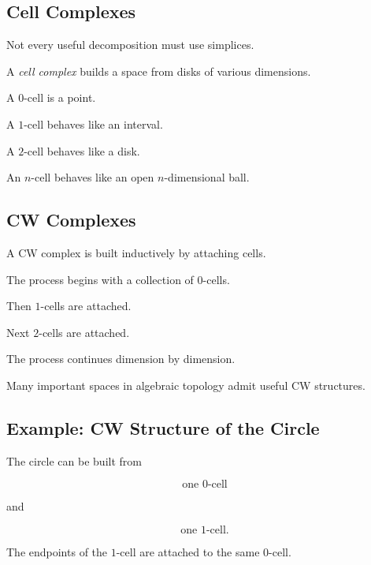 \subsection{Cell Complexes}
\label{subsec:cell-complexes}

Not every useful decomposition must use simplices.

A \emph{cell complex} builds a space from disks of various dimensions.

A \(0\)-cell is a point.

A \(1\)-cell behaves like an interval.

A \(2\)-cell behaves like a disk.

An \(n\)-cell behaves like an open \(n\)-dimensional ball.

\subsection{CW Complexes}
\label{subsec:cw-complexes}

A CW complex is built inductively by attaching cells.

The process begins with a collection of \(0\)-cells.

Then \(1\)-cells are attached.

Next \(2\)-cells are attached.

The process continues dimension by dimension.

Many important spaces in algebraic topology admit useful CW structures.

\subsection{Example: CW Structure of the Circle}
\label{subsec:cw-circle}

The circle can be built from

\[
\boxed{
\text{one }0\text{-cell}
}
\]

and

\[
\boxed{
\text{one }1\text{-cell}.
}
\]

The endpoints of the \(1\)-cell are attached to the same \(0\)-cell.

